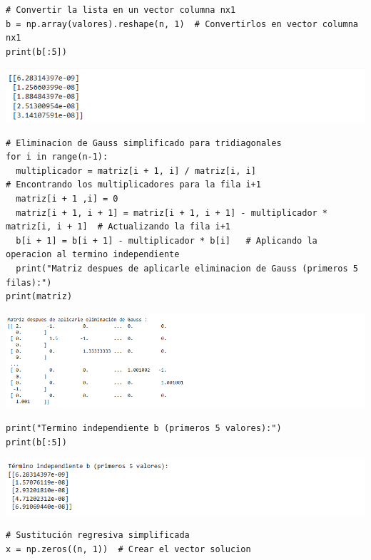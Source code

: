 \begin{homeworkProblem}
\begin{solucion}
\begin{enumerate}[a)]
\begin{lstlisting}
# Convertir la lista en un vector columna nx1
b = np.array(valores).reshape(n, 1)  # Convertirlos en vector columna nx1
print(b[:5])
          \end{lstlisting}
          \begin{center}
            \includegraphics[scale=1]{code2.png}
          \end{center}
          \begin{lstlisting}
# Eliminacion de Gauss simplificado para tridiagonales
for i in range(n-1):
  multiplicador = matriz[i + 1, i] / matriz[i, i]                      # Encontrando los multiplicadores para la fila i+1
  matriz[i + 1 ,i] = 0
  matriz[i + 1, i + 1] = matriz[i + 1, i + 1] - multiplicador * matriz[i, i + 1]  # Actualizando la fila i+1
  b[i + 1] = b[i + 1] - multiplicador * b[i]   # Aplicando la operacion al termino independiente
  print("Matriz despues de aplicarle eliminacion de Gauss (primeros 5 filas):")
print(matriz)
          \end{lstlisting}
          \begin{center}
            \includegraphics[scale=1]{code3.png}
          \end{center}
          \begin{lstlisting}
print("Termino independiente b (primeros 5 valores):")
print(b[:5])
          \end{lstlisting}
          \begin{center}
            \includegraphics[scale=1]{code4.png}
          \end{center}
          \begin{lstlisting}
# Sustitución regresiva simplificada
x = np.zeros((n, 1))  # Crear el vector solucion
            

\end{lstlisting}
\end{enumerate}
\end{solucion}
\end{homeworkProblem}
